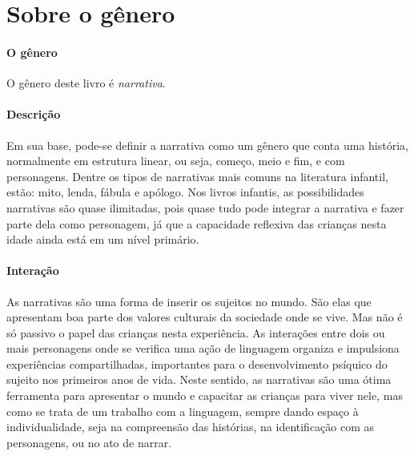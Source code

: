 \documentclass[11pt]{extarticle}
\begin{document}
\section{Sobre o gênero}

\paragraph{O gênero} O gênero deste livro é \textit{narrativa}. 

\paragraph{Descrição} Em sua base, pode-se definir a narrativa como um gênero que conta uma história, normalmente em estrutura linear, ou seja, começo, meio e fim, e com personagens. 
Dentre os tipos de narrativas mais comuns na literatura infantil, estão: mito, lenda, 
fábula e apólogo. Nos livros infantis, as possibilidades narrativas são quase ilimitadas, pois quase tudo pode integrar a narrativa e fazer parte dela como personagem, já que a capacidade reflexiva das crianças nesta idade ainda está em um nível primário. 


\paragraph{Interação} As narrativas são uma forma de inserir os sujeitos no mundo. 
São elas que apresentam boa parte dos valores culturais da sociedade 
onde se vive. Mas não é só passivo o papel das crianças nesta experiência. 
As interações entre dois ou mais personagens onde se verifica
uma ação de linguagem organiza e impulsiona experiências compartilhadas,
importantes para o desenvolvimento psíquico do sujeito nos primeiros anos de vida.
Neste sentido, as narrativas são uma ótima ferramenta para
apresentar o mundo e capacitar as crianças para viver nele, mas como se
trata de um trabalho com a linguagem, sempre dando espaço à individualidade, 
seja na compreensão das histórias, na identificação com as personagens, ou 
no ato de narrar.

\end{document}
